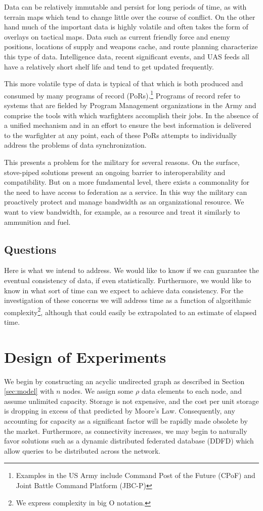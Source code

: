 \documentclass[10pt]{./IEEEtran}
\begin{document}
Data can be relatively immutable and persist for long periods of time, as with terrain maps which tend to change little over the course of conflict.  On the other hand much of the important data is highly volatile and often takes the form of overlays on tactical maps.  Data such as current friendly force and enemy positions, locations of supply and weapons cache, and route planning characterize this type of data.  Intelligence data, recent significant events, and UAS feeds all have a relatively short shelf life and tend to get updated frequently.

This more volatile type of data is typical of that which is both produced and consumed by many programs of record (PoRs).\footnote{Examples in the US Army include Command Post of the Future (CPoF) and Joint Battle Command Platform (JBC-P)}  Programs of record refer to systems that are fielded by Program Management organizations in the Army and comprise the tools with which warfighters accomplish their jobs.  In the absence of a unified mechanism and in an effort to ensure the best information is delivered to the warfighter at any point, each of these PoRs attempts to individually address the problems of data synchronization.

This presents a problem for the military for several reasons.  On the surface, stove-piped solutions present an ongoing barrier to interoperability and compatibility.  But on a more fundamental level, there exists a commonality for the need to have access to federation as a service.  In this way the military can proactively protect and manage bandwidth as an organizational resource.  We want to view bandwidth, for example, as a resource and treat it similarly to ammunition and fuel.


\subsection{Questions}
Here is what we intend to address.  We would like to know if we can guarantee the eventual consistency of data, if even statistically.  Furthermore, we would like to know in what sort of time can we expect to achieve data consistency. For the investigation of these concerns we will address time as a function of algorithmic complexity\footnote{We express complexity in big O notation.}, although that could easily be extrapolated to an estimate of elapsed time.


\section{Design of Experiments}
\label{sec:doe}
We begin by constructing an acyclic undirected graph as described in Section \ref{sec:model} with $n$ nodes.  We assign some $\rho$ data elements to each node, and assume unlimited capacity.  Storage is not expensive, and the cost per unit storage is dropping in excess of that predicted by Moore's Law.  Consequently, any accounting for capacity as a significant factor will be rapidly made obsolete by the market.  Furthermore, as connectivity increases, we may begin to naturally favor solutions such as a dynamic distributed federated database (DDFD) which allow queries to be distributed across the network\cite{Bent2009}.
\end{document}
